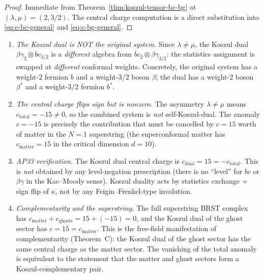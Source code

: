 \documentclass[11pt]{article}
\begin{document}
\begin{proof}
Immediate from Theorem~\ref{thm:koszul-tensor-bc-bg} at
$(\lambda, \mu) = (2, 3/2)$.  The central charge computation is
a direct substitution into \eqref{eq:c-bc-general} and
\eqref{eq:c-bg-general}.
\end{proof}

\begin{remark}
\label{rem:string-koszul-physics}
\mbox{}
\begin{enumerate}
\item \emph{The Koszul dual is NOT the original system.}
  Since $\lambda \neq \mu$, the Koszul dual
  $\beta\gamma_2 \otimes bc_{3/2}$ is a \emph{different}
  algebra from $bc_2 \otimes \beta\gamma_{3/2}$: the
  statistics assignment is swapped at \emph{different}
  conformal weights.  Concretely, the original system has a
  weight-$2$ fermion $b$ and a weight-$3/2$ boson $\beta$;
  the dual has a weight-$2$ boson $\beta^*$ and a weight-$3/2$
  fermion $b^*$.

\item \emph{The central charge flips sign but is nonzero.}
  The asymmetry $\lambda \neq \mu$ means
  $c_{\mathrm{total}} = -15 \neq 0$, so the combined system
  is \emph{not} self-Koszul-dual.  The anomaly $c = -15$
  is precisely the contribution that must be cancelled by
  $c = 15$ worth of matter in the $N = 1$ superstring
  (the superconformal matter has $c_{\mathrm{matter}} = 15$
  in the critical dimension $d = 10$).

\item \emph{AP33 verification.}  The Koszul dual central
  charge is $c_{\mathrm{dual}} = 15 = -c_{\mathrm{total}}$.
  This is \emph{not} obtained by any level-negation
  prescription (there is no ``level'' for $bc$ or
  $\beta\gamma$ in the Kac--Moody sense).  Koszul duality
  acts by statistics exchange $+$ sign flip of $\kappa$, not
  by any Feigin--Frenkel-type involution.

\item \emph{Complementarity and the superstring.}
  The full superstring BRST complex has
  $c_{\mathrm{matter}} + c_{\mathrm{ghosts}} =
  15 + (-15) = 0$, and the Koszul dual of the ghost sector
  has $c = 15 = c_{\mathrm{matter}}$.  This is the free-field
  manifestation of complementarity (Theorem~C): the Koszul
  dual of the ghost sector has the same central charge as
  the matter sector.  The vanishing of the total anomaly is
  equivalent to the statement that the matter and ghost
  sectors form a Koszul-complementary pair.
\end{enumerate}
\end{remark}
\end{document}
